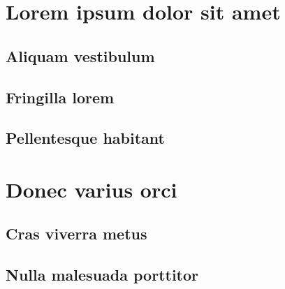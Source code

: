 
\chapter{Lorem ipsum dolor sit amet}

\section{Aliquam vestibulum}
\lipsum[2]

\section{Fringilla lorem}
\lipsum[3-5]

\section{Pellentesque habitant}
\lipsum[6-7]

\chapter{Donec varius orci}

\section{Cras viverra metus}
\lipsum[8-9]

\section{Nulla malesuada porttitor}
\lipsum[10-11]

